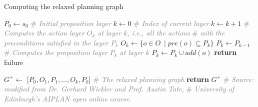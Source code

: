 \documentclass[ppgc,diss,english]{iiufrgs}
\begin{document}
\begin{algorithm}[tb]
\caption{Computing the relaxed planning graph}
\label{alg:computing-rpg}
\begin{algorithmic}[1]
  \State $P_{0} \gets s_{0}$ \textcolor{gray}{\# \emph{Initial proposition layer}}
  \State $k \gets 0$ \textcolor{gray}{\# \emph{Index of current layer}}
    \State $k \gets k + 1$
    \State \textcolor{gray}{\# \emph{Computes the action layer $O_{k}$ at layer $k$, i.e., all the actions}}
    \State \textcolor{gray}{\# \emph{with the preconditions satisfied in the layer $P_{k}$}}
    \State $O_{k} \gets \{o \in O\ \mid pre(o) \subseteq P_{k}\}$
    \State $P_{k} \gets P_{k-1}$
      \State \textcolor{gray}{\# \emph{Computes the proposition layer $P_{k}$ at layer $k$}}
      \State $P_{k} \gets P_{k} \cup add(o)$
    \EndFor
      \State \textbf{return} failure
    \EndIf

  \EndWhile

  \State $G^{+} \gets $ [$P_{0}, O_{1}, P_{1},\ldots,O_{k}, P_{k}$] \textcolor{gray}{\# \emph{The relaxed planning graph}}
  \State \textbf{return} $G^{+}$
\EndProcedure
\State \textcolor{gray}{\# \emph{Source: modified from Dr. Gerhard Wickler and Prof. Austin Tate,}}
\State \textcolor{gray}{\# \emph{University of Edinburgh's AIPLAN open online course.}}
\end{algorithmic}
\end{algorithm}
\end{document}

